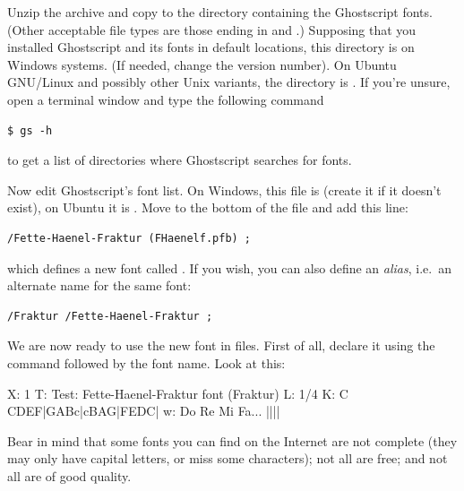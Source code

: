 \documentclass[a4paper,fullpage,12pt]{book}
\begin{document}
Unzip the archive and copy  to the directory
containing the Ghostscript fonts. (Other acceptable file types are
those ending in  and .) Supposing that you
installed Ghostscript and its fonts in default locations, this
directory is  on Windows systems.
(If needed, change the version number). On Ubuntu GNU/Linux and
possibly other Unix variants, the directory is 
. If you're unsure, open a
terminal window and type the following command 

\begin{verbatim}
$ gs -h
\end{verbatim}

to get a list of directories where Ghostscript searches for fonts.

Now edit Ghostscript's font list. On Windows, this file is
 (create it if it doesn't
exist), on Ubuntu it is
. Move to the bottom of
the file and add this line:

\begin{verbatim}
/Fette-Haenel-Fraktur (FHaenelf.pfb) ;
\end{verbatim}

which defines a new font called . If you
wish, you can also define an \emph{alias}, i.e.\ an alternate name for
the same font:

\begin{verbatim}
/Fraktur /Fette-Haenel-Fraktur ;
\end{verbatim}

We are now ready to use the new font in \ABC{} files. First of all,
declare it using the  command followed by the font name.
Look at this:

\begin{abcsource}
X: 1
T: Test: Fette-Haenel-Fraktur font (Fraktur)
L: 1/4
K: C
%
CDEF|GABc|cBAG|FEDC|
w: Do Re Mi Fa... ||||
\end{abcsource}


Bear in mind that some fonts you can find on the Internet are not
complete (they may only have capital letters, or miss some
characters); not all are free; and not all are of good quality.
\end{document}

